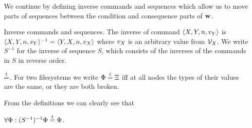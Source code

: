 \medskip

We continue by defining inverse commands and sequences
which allow us to move parts of sequences between the
condition and consequence parts of $\mathbf{w}$.

\begin{mydef}{Inverse commands and sequences.}
The inverse of command $\langle{X,Y,n,v_Y}\rangle$ is $\langle{X,Y,n,v_Y}\rangle^{-1} = \langle{Y,X,n,v_X}\rangle$
where $v_X$ is an arbitrary value from $\mathcal{V}_{X}$.
We write $S^{-1}$ for the inverse of sequence $S$, which consists of the inverses of the commands in $S$
in reverse order.
\end{mydef}

\begin{mydef}{$\stackrel{t}{=}$.}
For two filesystems we write $\Phi\stackrel{t}{=}\Xi$
iff 
at all nodes the types of their values are the same, or they are both broken.
\end{mydef}

From the definitions we can clearly see that
\begin{mycor}\label{negneg_is_typeeq}
$\forall \Phi: (S^{-1})^{-1}\Phi\stackrel{t}{=} \Phi$.
\end{mycor}

